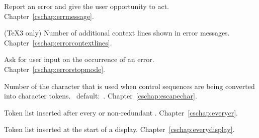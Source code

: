 \begin{glossinventory}
\item [\cs{errmessage\gr{general text}}]
      Report an error and give the user opportunity to act.
Chapter~\ref{cschap:errmessage}.

\item [\cs{errorcontextlines}]
      (\TeX3 only)
      Number of additional context lines shown in error messages.
Chapter~\ref{cschap:errorcontextlines}.

\item [\cs{errorstopmode}]
      Ask for user input on the occurrence of an error.
Chapter~\ref{cschap:errorstopmode}.

\item [\cs{escapechar}] 
      Number of the character that is  used 
      when control sequences are being converted
      into character tokens.
      \IniTeX\ default:~.
Chapter~\ref{cschap:escapechar}.

\item [\cs{everycr}]
      Token list inserted after every  or non-redundant .
Chapter~\ref{cschap:everycr}.

\item [\cs{everydisplay}]
      Token list inserted at the start of a display.
Chapter~\ref{cschap:everydisplay}.


\end{glossinventory}

